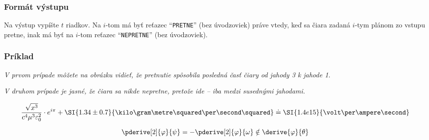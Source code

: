 \subsubsection{Formát výstupu}

Na výstup vypíšte $t$ riadkov. Na $i$-tom má byť reťazec
``\texttt{PRETNE}'' (bez úvodzoviek) práve vtedy, keď sa čiara zadaná
$i$-tym plánom zo vstupu pretne, inak má byť na $i$-tom reťazec
``\texttt{NEPRETNE}'' (bez úvodzoviek).

\subsubsection{Príklad}


\emph{V prvom prípade môžete na obrázku vidieť, že pretnutie spôsobila
posledná časť čiary od jahody 3 k jahode 1.}

\emph{V druhom prípade je jasné, že čiara sa nikde nepretne, pretože ide  -- iba
medzi susednými jahodami.}

$$\frac{\sqrt{x^3}}{c^4 \mu^3 \varepsilon_0^2} \cdot e^{i \pi} + \SI{1.34 \pm 0.7}{\kilo\gram\metre\squared\per\second\squared} \doteq
        \SI{1.4e15}{\volt\per\ampere\second}$$
    
$$\pderive[2]{\varphi}{\psi} = - \pderive[2]{\varphi}{\omega} \notin \derive{\varphi}{\theta}$$